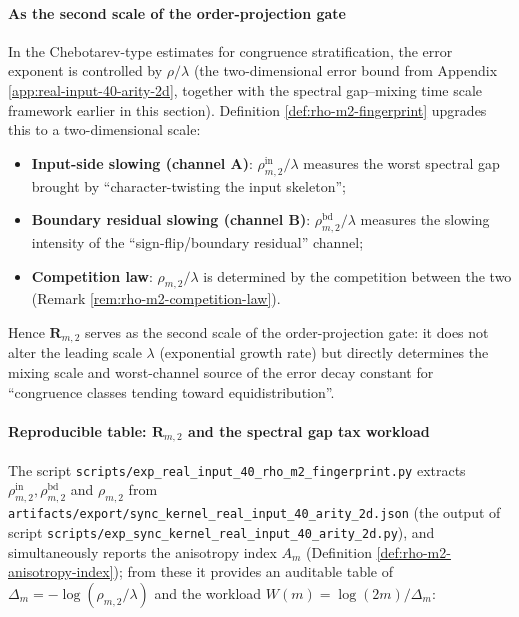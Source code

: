 \paragraph{As the second scale of the order-projection gate}
In the Chebotarev-type estimates for congruence stratification, the error exponent is controlled by \(\rho/\lambda\) (the two-dimensional error bound from Appendix \ref{app:real-input-40-arity-2d}, together with the spectral gap--mixing time scale framework earlier in this section).
Definition \ref{def:rho-m2-fingerprint} upgrades this to a two-dimensional scale:
\begin{itemize}
  \item \textbf{Input-side slowing (channel A)}: \(\rho^{\mathrm{in}}_{m,2}/\lambda\) measures the worst spectral gap brought by ``character-twisting the input skeleton'';
  \item \textbf{Boundary residual slowing (channel B)}: \(\rho^{\mathrm{bd}}_{m,2}/\lambda\) measures the slowing intensity of the ``sign-flip/boundary residual'' channel;
  \item \textbf{Competition law}: \(\rho_{m,2}/\lambda\) is determined by the competition between the two (Remark \ref{rem:rho-m2-competition-law}).
\end{itemize}
Hence \(\mathbf{R}_{m,2}\) serves as the second scale of the order-projection gate: it does not alter the leading scale \(\lambda\) (exponential growth rate) but directly determines the mixing scale and worst-channel source of the error decay constant for ``congruence classes tending toward equidistribution''.

\paragraph{Reproducible table: \texorpdfstring{$\mathbf{R}_{m,2}$}{R(m,2)} and the spectral gap tax workload}
The script \texttt{scripts/exp\_real\_input\_40\_rho\_m2\_fingerprint.py} extracts
\(\rho^{\mathrm{in}}_{m,2},\rho^{\mathrm{bd}}_{m,2}\) and \(\rho_{m,2}\) from
\texttt{artifacts/export/sync\_kernel\_real\_input\_40\_arity\_2d.json}
(the output of script \texttt{scripts/exp\_sync\_kernel\_real\_input\_40\_arity\_2d.py}), and simultaneously reports the anisotropy index \(A_m\) (Definition \ref{def:rho-m2-anisotropy-index}); from these it provides an auditable table of
\(\Delta_m=-\log(\rho_{m,2}/\lambda)\) and the workload \(W(m)=\log(2m)/\Delta_m\):


